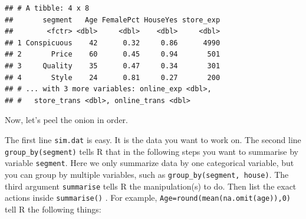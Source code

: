 \documentclass[12pt,]{krantz}
\newenvironment{Shaded}{\begin{snugshade}}{\end{snugshade}}
\newcommand{\KeywordTok}[1]{\textcolor[rgb]{0.13,0.29,0.53}{\textbf{{#1}}}}
\newcommand{\DataTypeTok}[1]{\textcolor[rgb]{0.13,0.29,0.53}{{#1}}}
\newcommand{\DecValTok}[1]{\textcolor[rgb]{0.00,0.00,0.81}{{#1}}}
\newcommand{\FloatTok}[1]{\textcolor[rgb]{0.00,0.00,0.81}{{#1}}}
\newcommand{\StringTok}[1]{\textcolor[rgb]{0.31,0.60,0.02}{{#1}}}
\newcommand{\NormalTok}[1]{{#1}}
\theoremstyle{definition}
\theoremstyle{definition}
\theoremstyle{remark}
\begin{document}
\begin{Shaded}
\end{Shaded}

\begin{verbatim}
## # A tibble: 4 x 8
##       segment   Age FemalePct HouseYes store_exp
##        <fctr> <dbl>     <dbl>    <dbl>     <dbl>
## 1 Conspicuous    42      0.32     0.86      4990
## 2       Price    60      0.45     0.94       501
## 3     Quality    35      0.47     0.34       301
## 4       Style    24      0.81     0.27       200
## # ... with 3 more variables: online_exp <dbl>,
## #   store_trans <dbl>, online_trans <dbl>
\end{verbatim}

Now, let's peel the onion in order.

The first line \texttt{sim.dat} is easy. It is the data you want to work
on. The second line \texttt{group\_by(segment)} tells R that in the
following steps you want to summarise by variable \texttt{segment}. Here
we only summarize data by one categorical variable, but you can group by
multiple variables, such as \texttt{group\_by(segment,\ house)}. The
third argument \texttt{summarise} tells R the manipulation(s) to do.
Then list the exact actions inside \texttt{summarise()} . For example,
\texttt{Age=round(mean(na.omit(age)),0)} tell R the following things:
\end{document}
